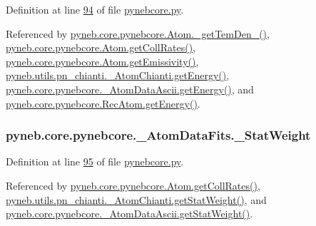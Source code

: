Definition at line \hyperlink{pynebcore_8py_source_l00094}{94} of file \hyperlink{pynebcore_8py_source}{pynebcore.\+py}.



Referenced by \hyperlink{pynebcore_8py_source_l01803}{pyneb.\+core.\+pynebcore.\+Atom.\+\_\+get\+Tem\+Den\+\_()}, \hyperlink{pynebcore_8py_source_l01329}{pyneb.\+core.\+pynebcore.\+Atom.\+get\+Coll\+Rates()}, \hyperlink{pynebcore_8py_source_l01716}{pyneb.\+core.\+pynebcore.\+Atom.\+get\+Emissivity()}, \hyperlink{pn__chianti_8py_source_l00346}{pyneb.\+utils.\+pn\+\_\+chianti.\+\_\+\+Atom\+Chianti.\+get\+Energy()}, \hyperlink{pynebcore_8py_source_l00525}{pyneb.\+core.\+pynebcore.\+\_\+\+Atom\+Data\+Ascii.\+get\+Energy()}, and \hyperlink{pynebcore_8py_source_l02811}{pyneb.\+core.\+pynebcore.\+Rec\+Atom.\+get\+Energy()}.

\hypertarget{classpyneb_1_1core_1_1pynebcore_1_1___atom_data_fits_a8bee4fc914c9542b85e4750eb63b7aa0}{}
\subsubsection[{\+\_\+\+Stat\+Weight}]{\setlength{\rightskip}{0pt plus 5cm}pyneb.\+core.\+pynebcore.\+\_\+\+Atom\+Data\+Fits.\+\_\+\+Stat\+Weight\hspace{0.3cm}{\ttfamily [private]}}\label{classpyneb_1_1core_1_1pynebcore_1_1___atom_data_fits_a8bee4fc914c9542b85e4750eb63b7aa0}


Definition at line \hyperlink{pynebcore_8py_source_l00095}{95} of file \hyperlink{pynebcore_8py_source}{pynebcore.\+py}.



Referenced by \hyperlink{pynebcore_8py_source_l01329}{pyneb.\+core.\+pynebcore.\+Atom.\+get\+Coll\+Rates()}, \hyperlink{pn__chianti_8py_source_l00323}{pyneb.\+utils.\+pn\+\_\+chianti.\+\_\+\+Atom\+Chianti.\+get\+Stat\+Weight()}, and \hyperlink{pynebcore_8py_source_l00502}{pyneb.\+core.\+pynebcore.\+\_\+\+Atom\+Data\+Ascii.\+get\+Stat\+Weight()}.

\hypertarget{classpyneb_1_1core_1_1pynebcore_1_1___atom_data_fits_a489ba89fa2e99786afc077e82acace4c}{}
